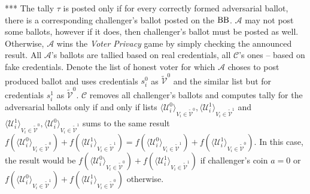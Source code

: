 *** The tally $\tau$ is posted only if for every correctly formed adversarial ballot, there is a corresponding challenger's ballot posted on the $\operatorname{BB}$. $\mathcal{A}$ may not post some ballots, however if it does, then challenger's ballot must be posted as well. Otherwise, $\mathcal{A}$ wins the \textit{Voter Privacy} game by simply checking the announced result.  All $\mathcal{A}$'s ballots are tallied based on real credentials, all  $\mathcal{C}$'s ones -- based on fake credentials. Denote the list of honest voter for which $\mathcal{A}$ choses to post produced ballot and uses credentials $s_i^0$  as $ \tilde{\mathcal{V}}^0$ and the similar list but for credentials $s_i^1$ as $ \tilde{\mathcal{V}}^0$.   $\mathcal{C}$ removes all challenger's ballots and computes tally for the adversarial ballots only if and only if  lists $\langle \mathcal{U}^0_i \rangle _{V_i \in \tilde{\mathcal{V}}^0}, \langle \mathcal{U}^1_i \rangle _{V_i \in \tilde{\mathcal{V}}^1}$ and $\langle \mathcal{U}^1_i \rangle _{V_i \in \tilde{\mathcal{V}}^0}, \langle \mathcal{U}^0_i \rangle _{V_i \in \tilde{\mathcal{V}}^1}$ sums to the same result $f(\langle \mathcal{U}^0_i \rangle _{V_i \in \tilde{\mathcal{V}}^0} ) + f(\langle \mathcal{U}^1_i \rangle _{V_i \in \tilde{\mathcal{V}}^1} ) =  f(\langle \mathcal{U}^0_i \rangle _{V_i \in \tilde{\mathcal{V}}^1} ) +  f(\langle \mathcal{U}^1_i \rangle _{V_i \in \tilde{\mathcal{V}}^0} )$. In this case, the result would be $f(\langle \mathcal{U}^0_i \rangle _{V_i \in \tilde{\mathcal{V}}^0} ) + f(\langle \mathcal{U}^1_i \rangle _{V_i \in \tilde{\mathcal{V}}^1} )$ if challenger's coin $a=0$ or  $f(\langle \mathcal{U}^0_i \rangle _{V_i \in \tilde{\mathcal{V}}^1} ) +  f(\langle \mathcal{U}^1_i \rangle _{V_i \in \tilde{\mathcal{V}}^0} )$ otherwise.\\

